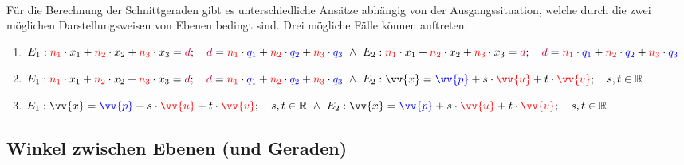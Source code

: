         \paragraph{} Für die Berechnung der Schnittgeraden gibt es unterschiedliche Ansätze abhängig von der
        Ausgangssituation, welche durch die zwei möglichen Darstellungsweisen von Ebenen bedingt sind. Drei mögliche
        Fälle können auftreten:
        \begin{enumerate}[1)]
            \item $E_1:\textcolor{red}{n_1} \cdot x_1 + \textcolor{red}{n_2} \cdot x_2 + \textcolor{red}{n_3} \cdot x_3 = \textcolor{purple}{d} ; \quad \textcolor{purple}{d} = \textcolor{red}{n_1} \cdot \textcolor{blue}{q_1} + \textcolor{red}{n_2} \cdot \textcolor{blue}{q_2} + \textcolor{red}{n_3} \cdot \textcolor{blue}{q_3} \text{ } \land \text{ } E_2:\textcolor{red}{n_1} \cdot x_1 + \textcolor{red}{n_2} \cdot x_2 + \textcolor{red}{n_3} \cdot x_3 = \textcolor{purple}{d} ; \quad \textcolor{purple}{d} = \textcolor{red}{n_1} \cdot \textcolor{blue}{q_1} + \textcolor{red}{n_2} \cdot \textcolor{blue}{q_2} + \textcolor{red}{n_3} \cdot \textcolor{blue}{q_3}$
            \item $E_1:\textcolor{red}{n_1} \cdot x_1 + \textcolor{red}{n_2} \cdot x_2 + \textcolor{red}{n_3} \cdot x_3 = \textcolor{purple}{d} ; \quad \textcolor{purple}{d} = \textcolor{red}{n_1} \cdot \textcolor{blue}{q_1} + \textcolor{red}{n_2} \cdot \textcolor{blue}{q_2} + \textcolor{red}{n_3} \cdot \textcolor{blue}{q_3} \text{ } \land \text{ } E_2:\vv{x}=\textcolor{blue}{\vv{p}} + s\cdot \textcolor{red}{\vv{u}} + t\cdot \textcolor{red}{\vv{v}};\quad s,t\in\R$
            \item $E_1:\vv{x}=\textcolor{blue}{\vv{p}} + s\cdot \textcolor{red}{\vv{u}} + t\cdot \textcolor{red}{\vv{v}};\quad s,t\in\R \text{ } \land \text{ } E_2:\vv{x}=\textcolor{blue}{\vv{p}} + s\cdot \textcolor{red}{\vv{u}} + t\cdot \textcolor{red}{\vv{v}};\quad s,t\in\R$
        \end{enumerate}


    \subsection{Winkel zwischen Ebenen (und Geraden)}

